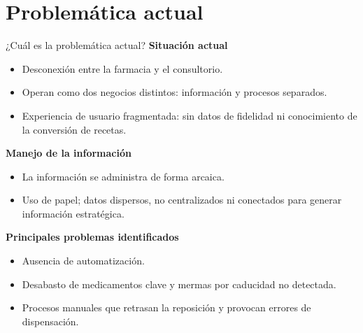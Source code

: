 \documentclass[aspectratio=169,11pt]{beamer}
\begin{document}
\section{Problemática actual}
\begin{frame}{¿Cuál es la problemática actual?}
  \textbf{Situación actual}
  \begin{itemize}
    \item Desconexión entre la farmacia y el consultorio.
    \item Operan como dos negocios distintos: información y procesos separados.
    \item Experiencia de usuario fragmentada: sin datos de fidelidad ni conocimiento de la conversión de recetas.
  \end{itemize}
  \textbf{Manejo de la información}
  \begin{itemize}
    \item La información se administra de forma arcaica.
    \item Uso de papel; datos dispersos, no centralizados ni conectados para generar información estratégica.
  \end{itemize}
  \textbf{Principales problemas identificados}
  \begin{itemize}
    \item Ausencia de automatización.
    \item Desabasto de medicamentos clave y mermas por caducidad no detectada.
    \item Procesos manuales que retrasan la reposición y provocan errores de dispensación.
  \end{itemize}
\end{frame}

\end{document}
